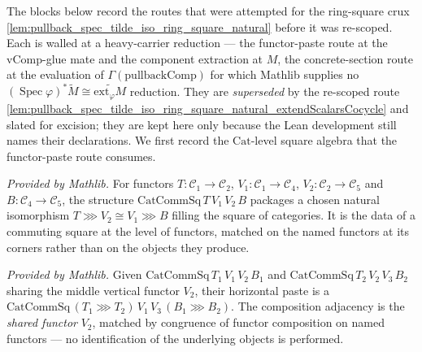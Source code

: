 The blocks below record the routes that were attempted for the ring-square crux
\cref{lem:pullback_spec_tilde_iso_ring_square_natural} before it was re-scoped. Each is walled at a
heavy-carrier reduction — the functor-paste route at the \(\mathrm{vComp}\)-glue mate and the
component extraction at \(M\), the concrete-section route at the evaluation of
\(\Gamma(\mathrm{pullbackComp})\) for which Mathlib supplies no
\((\operatorname{Spec}\varphi)^{*}\widetilde M \cong \widetilde{\mathrm{ext}_\varphi M}\) reduction.
They are \emph{superseded} by the re-scoped route
\cref{lem:pullback_spec_tilde_iso_ring_square_natural_extendScalarsCocycle} and slated for excision;
they are kept here only because the Lean development still names their declarations. We first record
the \(\mathrm{Cat}\)-level square algebra that the functor-paste route consumes.

\begin{lemma}
  \label{lem:catCommSq_mathlib}
  \mathlibok
  \textit{Provided by Mathlib.}
  For functors \(T : \mathcal{C}_1 \to \mathcal{C}_2\), \(V_1 : \mathcal{C}_1 \to \mathcal{C}_4\),
  \(V_2 : \mathcal{C}_2 \to \mathcal{C}_5\) and \(B : \mathcal{C}_4 \to \mathcal{C}_5\), the structure
  \(\mathrm{CatCommSq}\,T\,V_1\,V_2\,B\) packages a chosen natural isomorphism
  \(T \ggg V_2 \cong V_1 \ggg B\) filling the square of categories. It is the data of a commuting
  square at the level of functors, matched on the named functors at its corners rather than on the
  objects they produce.
\end{lemma}

\begin{lemma}
  \label{lem:catCommSq_hComp_mathlib}
  \mathlibok
  \textit{Provided by Mathlib.}
  Given \(\mathrm{CatCommSq}\,T_1\,V_1\,V_2\,B_1\) and \(\mathrm{CatCommSq}\,T_2\,V_2\,V_3\,B_2\)
  sharing the middle vertical functor \(V_2\), their horizontal paste is a
  \(\mathrm{CatCommSq}\,(T_1 \ggg T_2)\,V_1\,V_3\,(B_1 \ggg B_2)\). The composition adjacency is the
  \emph{shared functor} \(V_2\), matched by congruence of functor composition on named functors — no
  identification of the underlying objects is performed.
\end{lemma}

